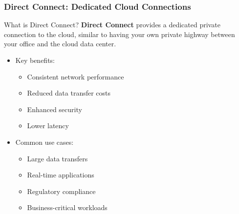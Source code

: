 \documentclass{beamer}
\begin{document}
\begin{frame}
    \frametitle{Direct Connect: Dedicated Cloud Connections}
    
    \begin{alertblock}{What is Direct Connect?}
        \textbf{Direct Connect} provides a dedicated private connection to the cloud, similar to having your own private highway between your office and the cloud data center.
    \end{alertblock}
    
    \begin{itemize}
        \item Key benefits:
        \begin{itemize}
            \item Consistent network performance
            \item Reduced data transfer costs
            \item Enhanced security
            \item Lower latency
        \end{itemize}
        
        \item Common use cases:
        \begin{itemize}
            \item Large data transfers
            \item Real-time applications
            \item Regulatory compliance
            \item Business-critical workloads
        \end{itemize}
    \end{itemize}
\end{frame}
\end{document}
